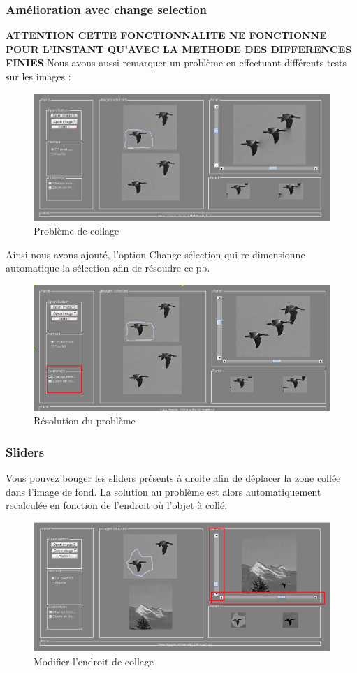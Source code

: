 \subsubsection{Amélioration avec change selection}
\textbf{ATTENTION CETTE FONCTIONNALITE NE FONCTIONNE POUR L'INSTANT QU'AVEC LA METHODE DES DIFFERENCES FINIES}
Nous avons aussi remarquer un problème en effectuant différents tests sur les images : 
\begin{figure}[!ht]
    \centering
    \includegraphics[scale = 0.15]{Images/pb.png}
    \caption{Problème de collage}
\end{figure}{}
\newpage
Ainsi nous avons ajouté, l'option Change sélection qui re-dimensionne automatique la sélection afin de résoudre ce pb. 
\begin{figure}[!ht]
    \centering
    \includegraphics[scale = 0.3]{Images/solve.png}
    \caption{Résolution du problème}
\end{figure}{}
\newpage

\subsubsection{Sliders}
Vous pouvez bouger les sliders présents à droite afin de déplacer la zone collée dans l'image de fond. La solution au problème est alors automatiquement recalculée en fonction de l'endroit où l'objet à collé. 
\begin{figure}[!h]
    \centering
    \includegraphics[scale = 0.2]{Images/move.png}
    \caption{Modifier l'endroit de collage}
\end{figure}
